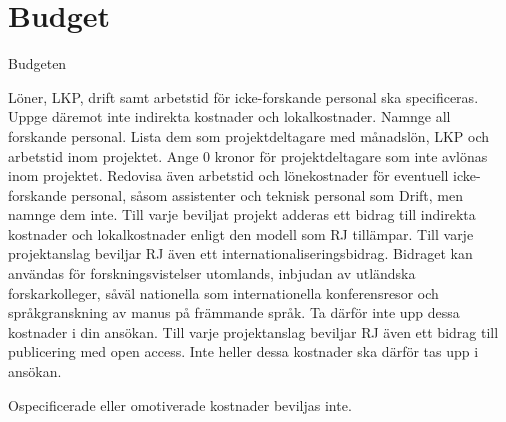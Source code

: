 ﻿\documentclass[12pt]{article}
\begin{document}
\section{Budget}
Budgeten

    Löner, LKP, drift samt arbetstid för icke-forskande personal ska specificeras. Uppge däremot inte indirekta kostnader och lokalkostnader.
    Namnge all forskande personal. Lista dem som projektdeltagare med månadslön, LKP och arbetstid inom projektet.
    Ange 0 kronor för projektdeltagare som inte avlönas inom projektet.
    Redovisa även arbetstid och lönekostnader för eventuell icke-forskande personal, såsom assistenter och teknisk personal som Drift, men namnge dem inte.
    Till varje beviljat projekt adderas ett bidrag till indirekta kostnader och lokalkostnader enligt den modell som RJ tillämpar.
    Till varje projektanslag beviljar RJ även ett internationaliseringsbidrag. Bidraget kan användas för forskningsvistelser utomlands, inbjudan av utländska forskarkolleger, såväl nationella som internationella konferensresor och språkgranskning av manus på främmande språk. Ta därför inte upp dessa kostnader i din ansökan.
    Till varje projektanslag beviljar RJ även ett bidrag till publicering med open access. Inte heller dessa kostnader ska därför tas upp i ansökan.

Ospecificerade eller omotiverade kostnader beviljas inte.



\end{document}
